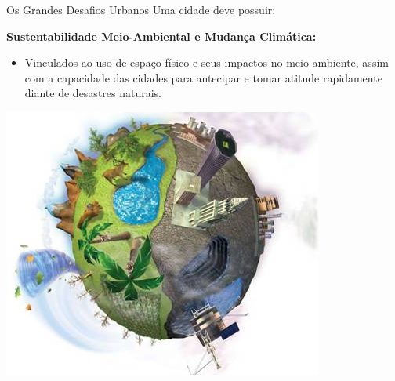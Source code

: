 \documentclass{beamer}
\begin{document}
\begin{frame}{Os Grandes Desafios Urbanos }
Uma cidade deve possuir:
\begin{block}{{\bf{Sustentabilidade Meio-Ambiental e Mudança Climática:}}}
\begin{itemize}
 \item  Vinculados ao uso de espaço físico e seus impactos no meio ambiente, assim 
com a capacidade das cidades para antecipar e tomar atitude rapidamente diante de desastres naturais.
\end{itemize}
\end{block}
\begin{center}
    \includegraphics[width=.36\textwidth]{img/mundo_ciudad_contaminacion.jpg}    
\end{center}

 



\end{frame}
\end{document}
